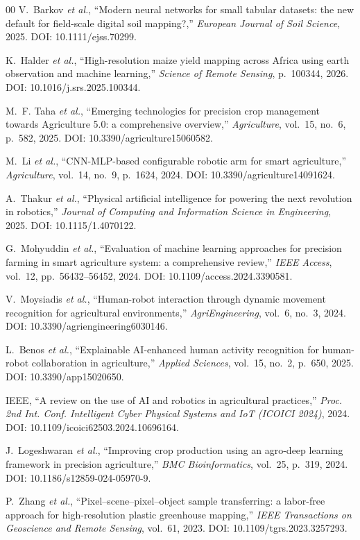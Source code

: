 \documentclass[conference]{IEEEtran}
\begin{document}
\begin{thebibliography}{00}
V.~Barkov \textit{et al.}, ``Modern neural networks for small tabular datasets: the new default for field-scale digital soil mapping?,''
\textit{European Journal of Soil Science}, 2025.
DOI: 10.1111/ejss.70299.

K.~Halder \textit{et al.}, ``High-resolution maize yield mapping across Africa using earth observation and machine learning,''
\textit{Science of Remote Sensing}, p.~100344, 2026.
DOI: 10.1016/j.srs.2025.100344.

M.~F. Taha \textit{et al.}, ``Emerging technologies for precision crop management towards Agriculture 5.0: a comprehensive overview,''
\textit{Agriculture}, vol.~15, no.~6, p.~582, 2025.
DOI: 10.3390/agriculture15060582.

M.~Li \textit{et al.}, ``CNN-MLP-based configurable robotic arm for smart agriculture,''
\textit{Agriculture}, vol.~14, no.~9, p.~1624, 2024.
DOI: 10.3390/agriculture14091624.

A.~Thakur \textit{et al.}, ``Physical artificial intelligence for powering the next revolution in robotics,''
\textit{Journal of Computing and Information Science in Engineering}, 2025.
DOI: 10.1115/1.4070122.

G.~Mohyuddin \textit{et al.}, ``Evaluation of machine learning approaches for precision farming in smart agriculture system: a comprehensive review,''
\textit{IEEE Access}, vol.~12, pp.~56432--56452, 2024.
DOI: 10.1109/access.2024.3390581.

V.~Moysiadis \textit{et al.}, ``Human-robot interaction through dynamic movement recognition for agricultural environments,''
\textit{AgriEngineering}, vol.~6, no.~3, 2024.
DOI: 10.3390/agriengineering6030146.

L.~Benos \textit{et al.}, ``Explainable AI-enhanced human activity recognition for human-robot collaboration in agriculture,''
\textit{Applied Sciences}, vol.~15, no.~2, p.~650, 2025.
DOI: 10.3390/app15020650.

IEEE, ``A review on the use of AI and robotics in agricultural practices,''
\textit{Proc. 2nd Int. Conf. Intelligent Cyber Physical Systems and IoT (ICOICI 2024)}, 2024.
DOI: 10.1109/icoici62503.2024.10696164.

J.~Logeshwaran \textit{et al.}, ``Improving crop production using an agro-deep learning framework in precision agriculture,''
\textit{BMC Bioinformatics}, vol.~25, p.~319, 2024.
DOI: 10.1186/s12859-024-05970-9.

P.~Zhang \textit{et al.}, ``Pixel--scene--pixel--object sample transferring: a labor-free approach for high-resolution plastic greenhouse mapping,''
\textit{IEEE Transactions on Geoscience and Remote Sensing}, vol.~61, 2023.
DOI: 10.1109/tgrs.2023.3257293.

\end{thebibliography}
\end{document}

